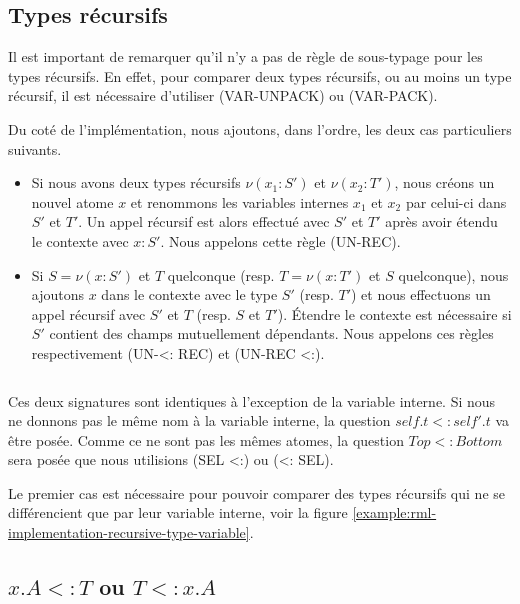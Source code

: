\subsection*{Types récursifs}

Il est important de remarquer qu'il n'y a pas de règle de sous-typage pour les
types récursifs. En effet, pour comparer deux types récursifs, ou au moins un
type récursif, il est nécessaire d'utiliser (VAR-UNPACK) ou (VAR-PACK).

Du coté de l'implémentation, nous ajoutons, dans l'ordre, les deux cas
particuliers suivants.

\begin{itemize}
\item Si nous avons deux types récursifs $\nu(x_{1} : S')$ et $\nu(x_{2} : T')$,
nous créons un nouvel atome $x$ et renommons les variables internes $x_{1}$ et
$x_{2}$ par celui-ci dans $S'$ et $T'$. Un appel récursif est alors effectué
avec $S'$ et $T'$ après avoir étendu le contexte avec $x : S'$. Nous appelons
cette règle (UN-REC).
\item Si $S = \nu(x : S')$ et $T$ quelconque (resp. $T = \nu(x : T')$ et $S$
  quelconque), nous ajoutons $x$ dans le contexte avec le type $S'$ (resp. $T'$) et
  nous effectuons un appel récursif avec $S'$ et $T$ (resp. $S$ et $T'$). Étendre
  le contexte est nécessaire si $S'$ contient des champs mutuellement dépendants.
  Nous appelons ces règles respectivement (UN-<: REC) et (UN-REC <:).
\end{itemize}

\begin{listing}
  \inputminted{OCaml}{codes/rml_implementation_recursive_type.rml}
  \caption{Ces deux signatures sont identiques à l'exception de la variable
    interne. Si nous ne donnons pas le même nom à la variable interne, la
    question $self.t <: self'.t$ va être posée. Comme ce ne sont pas les mêmes
    atomes, la question $Top <: Bottom$ sera posée que nous utilisions (SEL <:) ou
    (<: SEL).}
  \label{example:rml-implementation-recursive-type-variable}
\end{listing}

Le premier cas est nécessaire pour pouvoir comparer des types récursifs qui ne
se différencient que par leur variable interne, voir la figure
\ref{example:rml-implementation-recursive-type-variable}.

\subsection*{$x.A <: T$ ou $T <: x.A$}

